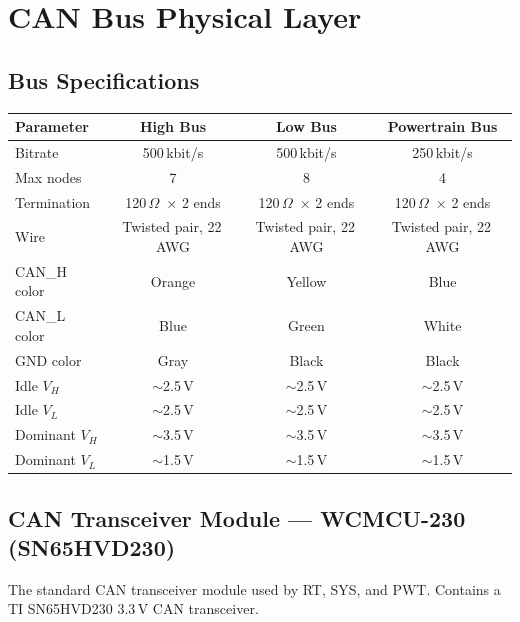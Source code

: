 \documentclass[12pt,a4paper,oneside]{report}
\begin{document}

\chapter{CAN Bus Physical Layer}

\section{Bus Specifications}

\begin{center}
\begin{tabular}{lccc}
\toprule
\textbf{Parameter} & \textbf{High Bus} & \textbf{Low Bus} & \textbf{Powertrain Bus} \\
\midrule
Bitrate         & 500\,kbit/s & 500\,kbit/s & 250\,kbit/s \\
Max nodes       & 7           & 8           & 4 \\
Termination     & 120\,$\Omega$\ $\times$ 2 ends & 120\,$\Omega$\ $\times$ 2 ends & 120\,$\Omega$\ $\times$ 2 ends \\
Wire            & Twisted pair, 22\,AWG & Twisted pair, 22\,AWG & Twisted pair, 22\,AWG \\
CAN\_H color    & Orange       & Yellow       & Blue \\
CAN\_L color    & Blue         & Green        & White \\
GND color       & Gray         & Black        & Black \\
Idle $V_H$      & $\sim$2.5\,V & $\sim$2.5\,V & $\sim$2.5\,V \\
Idle $V_L$      & $\sim$2.5\,V & $\sim$2.5\,V & $\sim$2.5\,V \\
Dominant $V_H$  & $\sim$3.5\,V & $\sim$3.5\,V & $\sim$3.5\,V \\
Dominant $V_L$  & $\sim$1.5\,V & $\sim$1.5\,V & $\sim$1.5\,V \\
\bottomrule
\end{tabular}
\end{center}

\section{CAN Transceiver Module --- WCMCU-230 (SN65HVD230)}

The standard CAN transceiver module used by RT, SYS, and PWT. Contains a TI SN65HVD230 3.3\,V CAN transceiver.
\end{document}
